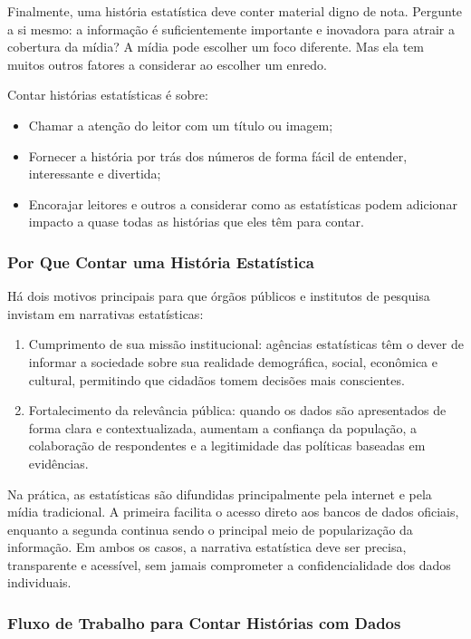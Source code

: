 Finalmente, uma história estatística deve conter material digno de nota. Pergunte a si mesmo: a informação é suficientemente importante e inovadora para atrair a cobertura da mídia? A mídia pode escolher um foco diferente. Mas ela tem muitos outros fatores a considerar ao escolher um enredo.

Contar histórias estatísticas é sobre:

\begin{itemize}
    \item Chamar a atenção do leitor com um título ou imagem;
    \item Fornecer a história por trás dos números de forma fácil de entender, interessante e divertida;
    \item Encorajar leitores e outros a considerar como as estatísticas podem adicionar impacto a quase todas as histórias que eles têm para contar.
\end{itemize}

\subsubsection{Por Que Contar uma História Estatística}

Há dois motivos principais para que órgãos públicos e institutos de pesquisa invistam em narrativas estatísticas:

\begin{enumerate}
    \item Cumprimento de sua missão institucional: agências estatísticas têm o dever de informar a sociedade sobre sua realidade demográfica, social, econômica e cultural, permitindo que cidadãos tomem decisões mais conscientes.
    \item Fortalecimento da relevância pública: quando os dados são apresentados de forma clara e contextualizada, aumentam a confiança da população, a colaboração de respondentes e a legitimidade das políticas baseadas em evidências.
\end{enumerate}

Na prática, as estatísticas são difundidas principalmente pela internet e pela mídia tradicional. A primeira facilita o acesso direto aos bancos de dados oficiais, enquanto a segunda continua sendo o principal meio de popularização da informação. Em ambos os casos, a narrativa estatística deve ser precisa, transparente e acessível, sem jamais comprometer a confidencialidade dos dados individuais.


\subsubsection{Fluxo de Trabalho para Contar Histórias com Dados}

